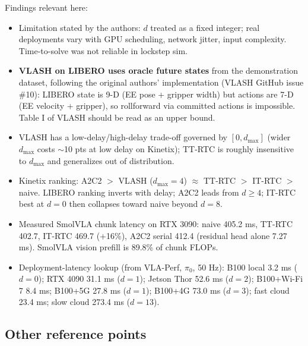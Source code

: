 \documentclass[10pt,letterpaper]{article}
\begin{document}
Findings relevant here:
\begin{itemize}
\item Limitation stated by the authors: $d$ treated as a fixed integer; real deployments vary with GPU scheduling, network jitter, input complexity. Time-to-solve was not reliable in lockstep sim.
\item \textbf{VLASH on LIBERO uses oracle future states} from the demonstration dataset, following the original authors' implementation (VLASH GitHub issue \#10): LIBERO state is 9-D (EE pose + gripper width) but actions are 7-D (EE velocity + gripper), so rollforward via committed actions is impossible. Table I of VLASH should be read as an upper bound.
\item VLASH has a low-delay/high-delay trade-off governed by $[0,d_{\max}]$ (wider $d_{\max}$ costs $\sim$10 pts at low delay on Kinetix); TT-RTC is roughly insensitive to $d_{\max}$ and generalizes out of distribution.
\item Kinetix ranking: A2C2 $>$ VLASH ($d_{\max}=4$) $\approx$ TT-RTC $>$ IT-RTC $>$ naive. LIBERO ranking inverts with delay; A2C2 leads from $d\ge4$; IT-RTC best at $d=0$ then collapses toward naive beyond $d=8$.
\item Measured SmolVLA chunk latency on RTX 3090: naive 405.2 ms, TT-RTC 402.7, IT-RTC 469.7 (+16\%), A2C2 serial 412.4 (residual head alone 7.27 ms). SmolVLA vision prefill is 89.8\% of chunk FLOPs.
\item Deployment-latency lookup (from VLA-Perf, $\pi_0$, 50 Hz): B100 local 3.2 ms ($d=0$); RTX 4090 31.1 ms ($d=1$); Jetson Thor 52.6 ms ($d=2$); B100+Wi-Fi 7 8.4 ms; B100+5G 27.8 ms ($d=1$); B100+4G 73.0 ms ($d=3$); fast cloud 23.4 ms; slow cloud 273.4 ms ($d=13$).
\end{itemize}

\subsection{Other reference points}
\end{document}
